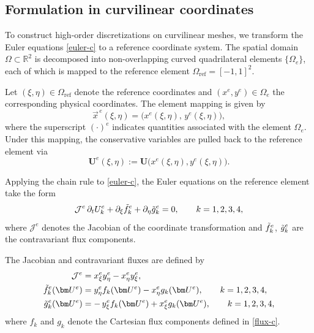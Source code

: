 \documentclass[fleqn,11pt]{amsart}
\begin{document}
\subsection{Formulation in curvilinear coordinates}
\label{sec_form_in_curve}

To construct high-order discretizations on curvilinear meshes, we transform the Euler equations
\eqref{euler-c} to a reference coordinate system.
The spatial domain $\Omega\subset\mathbb R^2$ is decomposed into non-overlapping curved quadrilateral
elements $\{\Omega_e\}$, each of which is mapped to the reference element
$\Omega_{\mathrm{ref}}=[-1,1]^2$.

Let $(\xi,\eta)\in\Omega_{\mathrm{ref}}$ denote the reference coordinates and
$(x^e,y^e)\in\Omega_e$ the corresponding physical coordinates.
The element mapping is given by
\[
\vec{x}^{\,e}(\xi,\eta)
=
\big(x^{e}(\xi,\eta),\,y^{e}(\xi,\eta)\big),
\]
where the superscript $(\cdot)^e$ indicates quantities associated with the element $\Omega_e$.
Under this mapping, the conservative variables are pulled back to the reference element via
\[
\bm U^e(\xi,\eta) := \bm U\big(x^e(\xi,\eta),y^e(\xi,\eta)\big).
\]

Applying the chain rule to \eqref{euler-c}, the Euler equations on the reference element take the form
\begin{equation}
\mathcal J^{e}\,\partial_t U_k^e
+
\partial_{\xi}\Tilde{f}_k^e
+
\partial_{\eta}\Tilde{g}_k^e
=0,
\qquad k=1,2,3,4,
\label{eq_curve_coord}
\end{equation}
where $\mathcal J^{e}$ denotes the Jacobian of the coordinate transformation and
$\Tilde{f}_k^e$, $\Tilde{g}_k^e$ are the contravariant flux components.

The Jacobian and contravariant fluxes are defined by
\begin{equation}
\begin{aligned}
\mathcal J^{e}
&=
x^{e}_{\xi}y^{e}_{\eta}-x^{e}_{\eta}y^{e}_{\xi},\\
\Tilde{f}_k^e(\bm U^e)
&=
y^{e}_{\eta}f_k(\bm U^e)-x^{e}_{\eta}g_k(\bm U^e),
\qquad k=1,2,3,4,\\
\Tilde{g}_k^e(\bm U^e)
&=
-\,y^{e}_{\xi}f_k(\bm U^e)+x^{e}_{\xi}g_k(\bm U^e),
\qquad k=1,2,3,4,
\end{aligned}
\label{eq_curve_term}
\end{equation}
where $f_k$ and $g_k$ denote the Cartesian flux components defined in
\eqref{flux-c}.
\end{document}
